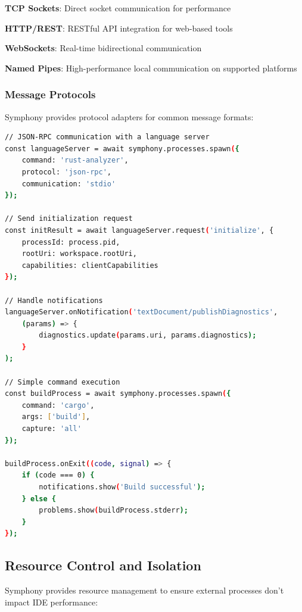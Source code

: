 \begin{compactlist}
    \item \textbf{TCP Sockets}: Direct socket communication for performance
    \item \textbf{HTTP/REST}: RESTful API integration for web-based tools
    \item \textbf{WebSockets}: Real-time bidirectional communication
    \item \textbf{Named Pipes}: High-performance local communication on supported platforms
\end{compactlist}

\subsubsection*{Message Protocols}

Symphony provides protocol adapters for common message formats:

\begin{lstlisting}[language=bash, caption=Protocol Communication Example]
// JSON-RPC communication with a language server
const languageServer = await symphony.processes.spawn({
    command: 'rust-analyzer',
    protocol: 'json-rpc',
    communication: 'stdio'
});

// Send initialization request
const initResult = await languageServer.request('initialize', {
    processId: process.pid,
    rootUri: workspace.rootUri,
    capabilities: clientCapabilities
});

// Handle notifications
languageServer.onNotification('textDocument/publishDiagnostics', 
    (params) => {
        diagnostics.update(params.uri, params.diagnostics);
    }
);

// Simple command execution
const buildProcess = await symphony.processes.spawn({
    command: 'cargo',
    args: ['build'],
    capture: 'all'
});

buildProcess.onExit((code, signal) => {
    if (code === 0) {
        notifications.show('Build successful');
    } else {
        problems.show(buildProcess.stderr);
    }
});
\end{lstlisting}

\subsection*{Resource Control and Isolation}

Symphony provides resource management to ensure external processes don't impact IDE performance:

